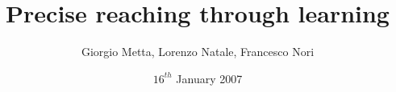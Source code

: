 \title {Precise reaching through learning}
\author{Giorgio Metta, Lorenzo Natale, Francesco Nori}
\date{$16^{th}$ January 2007}
\maketitle